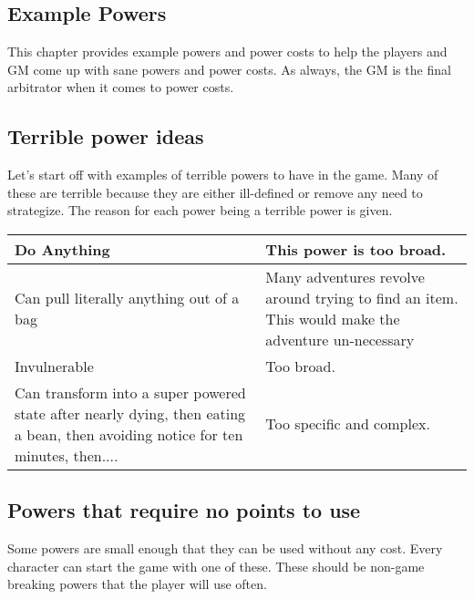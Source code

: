 \begin{flushleft}

\chapter{Example Powers} \label{example_powers}

This chapter provides example powers and power costs to help the players and
GM come up with sane powers and power costs. As always, the GM is the final
arbitrator when it comes to power costs.

\section*{Terrible power ideas}

Let's start off with examples of terrible powers to have in the game. Many of
these are terrible because they are either ill-defined or remove any need to
strategize. The reason for each power being a terrible power is given.

\begin{center}
\begin{tabular}{ |p{6cm}|p{6cm}|}
\hline
Do Anything & This power is too broad. \\
\hline
Can pull literally anything out of a bag & Many adventures revolve around
trying to find an item. This would make the adventure un-necessary \\
\hline
Invulnerable & Too broad. \\
\hline
Can transform into a super powered state after nearly dying, then eating a bean,
then avoiding notice for ten minutes, then.... & Too specific and complex. \\
\hline
\end{tabular}
\end{center}

\section*{Powers that require no points to use}

Some powers are small enough that they can be used without any cost. Every
character can start the game with one of these. These should be non-game
breaking powers that the player will use often.


\end{flushleft}
